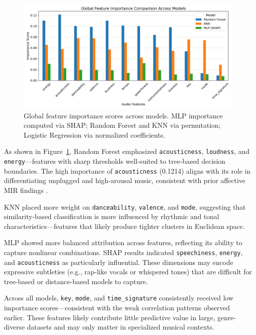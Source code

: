 \documentclass{article}
\begin{document}
\begin{figure}[H]
\centering
\includegraphics[width=\textwidth]{Graphics/global_feature_importance_comparison.pdf}
\caption{Global feature importance scores across models. MLP importance computed via SHAP; Random Forest and KNN via permutation; Logistic Regression via normalized coefficients.}
\label{fig:feature_importance}
\end{figure}

As shown in Figure~\ref{fig:feature_importance}, Random Forest emphasized \texttt{acousticness}, \texttt{loudness}, and \texttt{energy}—features with sharp thresholds well-suited to tree-based decision boundaries. The high importance of \texttt{acousticness} (0.1214) aligns with its role in differentiating unplugged and high-arousal music, consistent with prior affective MIR findings \parencite{Huron2015, McCraty1998}.

KNN placed more weight on \texttt{danceability}, \texttt{valence}, and \texttt{mode}, suggesting that similarity-based classification is more influenced by rhythmic and tonal characteristics—features that likely produce tighter clusters in Euclidean space.

MLP showed more balanced attribution across features, reflecting its ability to capture nonlinear combinations. SHAP results indicated \texttt{speechiness}, \texttt{energy}, and \texttt{acousticness} as particularly influential. These dimensions may encode expressive subtleties (e.g., rap-like vocals or whispered tones) that are difficult for tree-based or distance-based models to capture.

Across all models, \texttt{key}, \texttt{mode}, and \texttt{time\_signature} consistently received low importance scores—consistent with the weak correlation patterns observed earlier. These features likely contribute little predictive value in large, genre-diverse datasets and may only matter in specialized musical contexts.
\end{document}
